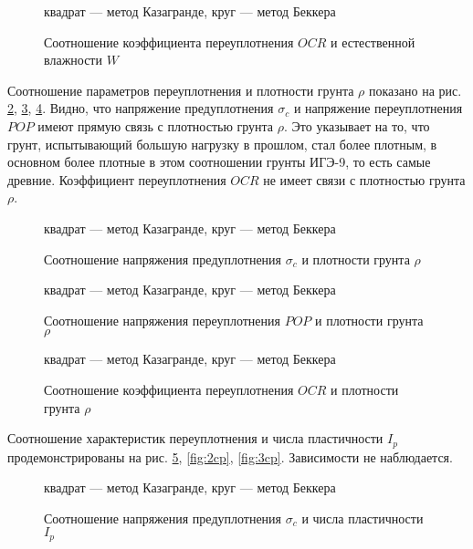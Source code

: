\begin{figure}[h!]
  \caption{Соотношение коэффициента переуплотнения $OCR$ и 
  естественной 
  влажности $W$}\label{fig:3vl}
  квадрат --- метод Казагранде, круг --- метод Беккера
\end{figure}

Соотношение параметров переуплотнения и плотности грунта $\rho$ 
показано на рис. \ref{fig:1pl}, \ref{fig:2pl}, \ref{fig:3pl}. 
Видно, что напряжение предуплотнения $\sigma_c$ 
и напряжение переуплотнения $POP$ имеют прямую связь с 
плотностью грунта $\rho$. Это указывает на то, что 
грунт, испытывающий большую нагрузку в прошлом, 
стал более плотным, в основном более плотные в 
этом соотношении грунты ИГЭ-9, то есть самые древние.
Коэффициент переуплотнения $OCR$ не имеет 
связи с плотностью грунта $\rho$.

\begin{figure}[!p]
  \caption{Соотношение напряжения предуплотнения $\sigma_c$ и плотности грунта $\rho$}\label{fig:1pl}
  квадрат --- метод Казагранде, круг --- метод Беккера
\end{figure}

\begin{figure}[!p]
  \caption{Соотношение напряжения переуплотнения $POP$ и 
  плотности грунта $\rho$}\label{fig:2pl}
  квадрат --- метод Казагранде, круг --- метод Беккера
\end{figure}

\begin{figure}[!p]
  \caption{Соотношение коэффициента переуплотнения $OCR$ и 
  плотности грунта $\rho$}\label{fig:3pl}
  квадрат --- метод Казагранде, круг --- метод Беккера
\end{figure}

Соотношение характеристик переуплотнения и 
числа пластичности $I_p$ продемонстрированы на рис. \ref{fig:1cp}, \ref{fig:2cp}, \ref{fig:3cp}.
Зависимости не наблюдается.

\begin{figure}[!p]
  \caption{Соотношение напряжения предуплотнения $\sigma_c$ и числа пластичности $I_p$}\label{fig:1cp}
  квадрат --- метод Казагранде, круг --- метод Беккера
\end{figure}

